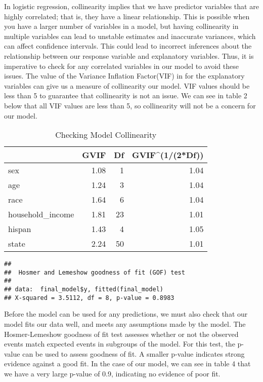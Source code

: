 \documentclass[
]{article}
\begin{document}
In logistic regression, collinearity implies that we have predictor variables that are highly correlated; that is, they have a linear relationship. This is possible when you have a larger number of variables in a model, but having collinearity in multiple variables can lead to unstable estimates and inaccurate variances, which can affect confidence intervals. This could lead to incorrect inferences about the relationship between our response variable and explanatory variables. Thus, it is imperative to check for any correlated variables in our model to avoid these issues. The value of the Variance Inflation Factor(VIF) in for the explanatory variables can give us a measure of collinearity our model. VIF values should be less than 5 to guarantee that collinearity is not an issue. We can see in table 2 below that all VIF values are less than 5, so collinearity will not be a concern for our model.

\begin{table}

\caption{\label{tab:unnamed-chunk-2}Checking Model Collinearity}
\centering
\begin{tabular}[t]{l|r|r|r}
\hline
  & GVIF & Df & GVIF\textasciicircum{}(1/(2*Df))\\
\hline
sex & 1.08 & 1 & 1.04\\
\hline
age & 1.24 & 3 & 1.04\\
\hline
race & 1.64 & 6 & 1.04\\
\hline
household\_income & 1.81 & 23 & 1.01\\
\hline
hispan & 1.43 & 4 & 1.05\\
\hline
state & 2.24 & 50 & 1.01\\
\hline
\end{tabular}
\end{table}

\begin{verbatim}
## 
##  Hosmer and Lemeshow goodness of fit (GOF) test
## 
## data:  final_model$y, fitted(final_model)
## X-squared = 3.5112, df = 8, p-value = 0.8983
\end{verbatim}

Before the model can be used for any predictions, we must also check that our model fits our data well, and meets any assumptions made by the model. The Hosmer-Lemeshow goodness of fit test assesses whether or not the observed events match expected events in subgroups of the model. For this test, the p-value can be used to assess goodness of fit. A smaller p-value indicates strong evidence against a good fit. In the case of our model, we can see in table 4 that we have a very large p-value of 0.9, indicating no evidence of poor fit.
\end{document}
